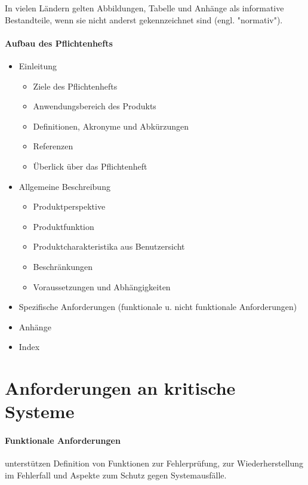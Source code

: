 In vielen Ländern gelten Abbildungen, Tabelle und Anhänge als informative Bestandteile, wenn sie nicht anderst gekennzeichnet sind (engl. "normativ").

\paragraph{Aufbau des Pflichtenhefts}
\begin{itemize}

\item { Einleitung
\begin{itemize}
\item Ziele des Pflichtenhefts
\item Anwendungsbereich des Produkts
\item Definitionen, Akronyme und Abkürzungen
\item Referenzen
\item Überlick über das Pflichtenheft
\end{itemize}
}

\item { Allgemeine Beschreibung
\begin{itemize}
\item Produktperspektive
\item Produktfunktion
\item Produktcharakteristika aus Benutzersicht
\item Beschränkungen
\item Voraussetzungen und Abhängigkeiten
\end{itemize}
}

\item Spezifische Anforderungen (funktionale u. nicht funktionale Anforderungen)

\item Anhänge
\item Index

\end{itemize}

\section{Anforderungen an kritische Systeme}

\paragraph{Funktionale Anforderungen} unterstützen Definition von Funktionen zur Fehlerprüfung, zur Wiederherstellung im Fehlerfall und Aspekte zum Schutz gegen Systemausfälle.

